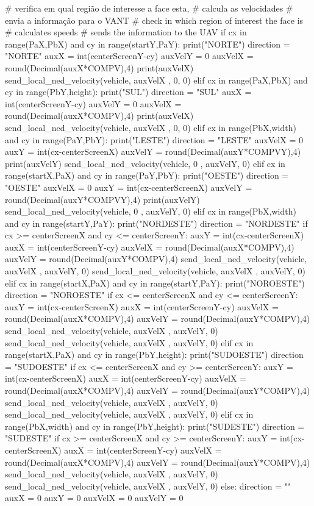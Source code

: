 \begin{apendicesenv}
\begin{python_}
		# verifica em qual região de interesse a face esta,
		# calcula as velocidades
		# envia a informação para o VANT
		# check in which region of interest the face is
		# calculates speeds
		# sends the information to the UAV
		if cx in range(PaX,PbX) and cy in range(startY,PaY):
			print("NORTE")
			direction = "NORTE"
			auxX = int(centerScreenY-cy)
			auxVelY = 0
			auxVelX = round(Decimal(auxX*COMPV),4)
			print(auxVelX)
			send_local_ned_velocity(vehicle, auxVelX , 0, 0)
		elif cx in range(PaX,PbX) and cy in range(PbY,height):
			print("SUL")
			direction = "SUL"
			auxX = int(centerScreenY-cy)
			auxVelY = 0
			auxVelX = round(Decimal(auxX*COMPV),4)
			print(auxVelX)
			send_local_ned_velocity(vehicle, auxVelX , 0, 0)
		elif cx in range(PbX,width) and cy in range(PaY,PbY):
			print("LESTE")
			direction = "LESTE"
			auxVelX = 0
			auxY = int(cx-centerScreenX)
			auxVelY = round(Decimal(auxY*COMPVY),4)	
			print(auxVelY)
			send_local_ned_velocity(vehicle, 0 , auxVelY, 0)
		elif cx in range(startX,PaX) and cy in range(PaY,PbY):
			print("OESTE")
			direction = "OESTE"	
			auxVelX = 0
			auxY = int(cx-centerScreenX)
			auxVelY = round(Decimal(auxY*COMPVY),4)
			print(auxVelY)
			send_local_ned_velocity(vehicle, 0 , auxVelY, 0)
		elif cx in range(PbX,width) and cy in range(startY,PaY):
			print("NORDESTE")
			direction = "NORDESTE"
			if cx >= centerScreenX and cy <= centerScreenY:
				auxY = int(cx-centerScreenX)
				auxX = int(centerScreenY-cy)
				auxVelX = round(Decimal(auxX*COMPV),4)
				auxVelY = round(Decimal(auxY*COMPV),4)
				send_local_ned_velocity(vehicle, auxVelX , auxVelY, 0)
				send_local_ned_velocity(vehicle, auxVelX , auxVelY, 0)
		elif cx in range(startX,PaX) and cy in range(startY,PaY):
			print("NOROESTE")
			direction = "NOROESTE"
			if cx <= centerScreenX and cy <= centerScreenY:
				auxY = int(cx-centerScreenX)
				auxX = int(centerScreenY-cy)
				auxVelX = round(Decimal(auxX*COMPV),4)
				auxVelY = round(Decimal(auxY*COMPV),4)
				send_local_ned_velocity(vehicle, auxVelX , auxVelY, 0)
				send_local_ned_velocity(vehicle, auxVelX , auxVelY, 0)
		elif cx in range(startX,PaX) and cy in range(PbY,height):
			print("SUDOESTE")
			direction = "SUDOESTE"
			if cx <= centerScreenX and cy >= centerScreenY:
				auxY = int(cx-centerScreenX)
				auxX = int(centerScreenY-cy)
				auxVelX = round(Decimal(auxX*COMPV),4)
				auxVelY = round(Decimal(auxY*COMPV),4)
				send_local_ned_velocity(vehicle, auxVelX , auxVelY, 0)
				send_local_ned_velocity(vehicle, auxVelX , auxVelY, 0)
		elif cx in range(PbX,width) and cy in range(PbY,height):
			print("SUDESTE")
			direction = "SUDESTE"
			if cx >= centerScreenX and cy >= centerScreenY:
				auxY = int(cx-centerScreenX)
				auxX = int(centerScreenY-cy)
				auxVelX = round(Decimal(auxX*COMPV),4)
				auxVelY = round(Decimal(auxY*COMPV),4)
				send_local_ned_velocity(vehicle, auxVelX , auxVelY, 0)
				send_local_ned_velocity(vehicle, auxVelX , auxVelY, 0)
		else:
			direction = ""
			auxX = 0
			auxY = 0
			auxVelX = 0
			auxVelY = 0
	

\end{python_}
\end{apendicesenv}
